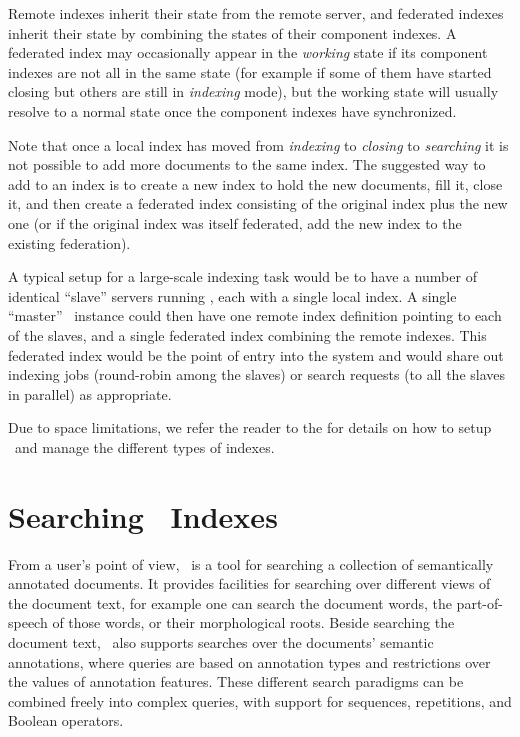 Remote indexes inherit their state from the remote server, and federated
indexes inherit their state by combining the states of their component indexes.
A federated index may occasionally appear in the {\em working} state if its
component indexes are not all in the same state (for example if some of them
have started closing but others are still in {\em indexing} mode), but the
working state will usually resolve to a normal state once the component indexes
have synchronized.

Note that once a local index has moved from {\em indexing} to {\em closing} to
{\em searching} it is not possible to add more documents to the same index.
The suggested way to add to an index is to create a new index to hold the new
documents, fill it, close it, and then create a federated index consisting of
the original index plus the new one (or if the original index was itself
federated, add the new index to the existing federation).

A typical setup for a large-scale indexing task would be to have a number of
identical ``slave'' servers running \Mimir, each with a single local index.  A
single ``master'' \Mimir\ instance could then have one remote index definition
pointing to each of the slaves, and a single federated index combining the
remote indexes.  This federated index would be the point of entry into the
system and would share out indexing jobs (round-robin among the slaves) or
search requests (to all the slaves in parallel) as appropriate.

Due to space limitations, we refer the reader to the 
 for 
details on how to setup \Mimir\ and manage the different types of indexes.


\section{Searching \Mimir\ Indexes}\label{sec:mimir:searching}

From a user's point of view, \Mimir\ is a tool for searching a collection of
semantically annotated documents.  It provides facilities for searching over
different views of the document text, for example one can search the document
words, the part-of-speech of those words, or their morphological roots. Beside
searching the document text, \Mimir\ also supports searches over the documents'
semantic annotations, where queries are based on annotation types and
restrictions over the values of annotation features. These different search
paradigms can be combined freely into complex queries, with support for
sequences, repetitions, and Boolean operators.


